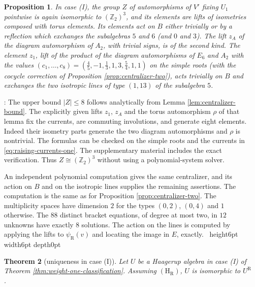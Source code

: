 \documentclass[leqno]{article}
\newcommand{\Z}{\ensuremath{\mathbb{Z}}}
\renewcommand{\leq}{\ensuremath{\leqslant}}
\newcommand{\qed}{\hfill \vrule height6pt  width6pt depth0pt}
\newtheorem{thm}{Theorem}[section]
\newtheorem{prop}[thm]{Proposition}
\newenvironment{proof}[1][]{\noindent {\it Proof #1} : }{\hbox{~}\qed
\smallskip
}
\numberwithin{equation}{section}
\begin{document}
\begin{prop}
\label{prop:centralizer-one}
In case (I), the group $Z$ of automorphisms of $V'$ fixing $U_1$ pointwise is again isomorphic to $(\Z_2)^3$, and its elements are lifts of isometries composed with torus elements. Its elements act on $B$ either trivially or by a reflection which exchanges the subalgebras $5$ and $6$ (and $0$ and $3$). The lift $z_A$ of the diagram automorphism of $A_2$, with trivial signs, is of the second kind. The element $z_1$, lift of the product of the diagram automorphisms of $E_6$ and $A_2$ with the values $(c_1,\ldots,c_8) = (\frac45, -1, \frac13, 1, 3, \frac54, 1, 1)$ on the simple roots (with the cocycle correction of Proposition \ref{prop:centralizer-two}), acts trivially on $B$ and exchanges the two isotropic lines of type $(1,13)$ of the subalgebra $5$.
\end{prop}

\begin{proof}
The upper bound $|Z| \leq 8$ follows analytically from Lemma \ref{lem:centralizer-bound}. The explicitly given lifts $z_1$, $z_A$ and the torus automorphism $\rho$ of that lemma fix the currents, are commuting involutions, and generate eight elements. Indeed their isometry parts generate the two diagram automorphisms and $\rho$ is nontrivial. The formulas can be checked on the simple roots and the currents in \eqref{eq:raising-currents-one}. The supplementary material includes the exact verification. Thus $Z \cong (\Z_2)^3$ without using a polynomial-system solver.

An independent polynomial computation gives the same centralizer, and its action on $B$ and on the isotropic lines supplies the remaining assertions. The computation is the same as for Proposition \ref{prop:centralizer-two}. The multiplicity spaces have dimension $2$ for the types $(0,2)$, $(0,4)$ and $1$ otherwise. The $88$ distinct bracket equations, of degree at most two, in $12$ unknowns have exactly $8$ solutions. The action on the lines is computed by applying the lifts to $\psi_{\mathrm R}(v)$ and locating the image in $E$, exactly.
\end{proof}

\begin{thm}[uniqueness in case (I)]
\label{thm:uniqueness-one}
Let $U$ be a Haagerup algebra in case (I) of Theorem \ref{thm:weight-one-classification}. Assuming $\mathrm{(H_R)}$, $U$ is isomorphic to $U^{\mathrm R}$.
\end{thm}
\end{document}
